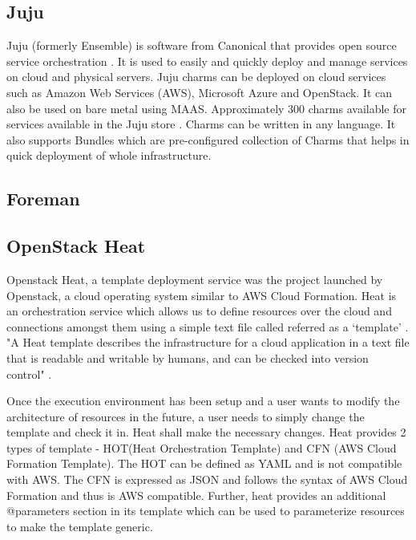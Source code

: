 {     \pv

\subsection{Juju}

     Juju (formerly Ensemble) is software from
     Canonical that provides open source service orchestration \cite{juju-paper}.
     It is
     used to easily and quickly deploy and manage services on cloud
     and physical servers. Juju charms can be deployed on cloud
     services such as Amazon Web Services (AWS), Microsoft Azure and
     OpenStack. It can also be used on bare metal using MAAS.
     Approximately 300 charms available
     for services available in the Juju store \cite{www-juju}. Charms can be written
     in any language. It also supports Bundles which are
     pre-configured collection of Charms that helps in quick
     deployment of whole infrastructure.

     \pv

\subsection{Foreman}

\pv 

\subsection{OpenStack Heat}

     Openstack Heat, a template deployment service was the project
     launched by Openstack, a cloud operating system similar to AWS
     Cloud Formation. Heat
     is an orchestration service which allows us to define resources
     over the cloud and connections amongst them using a simple text
     file called referred as a ‘template’ \cite{www-heat-blog-introduction}.
     "A Heat template describes
     the infrastructure for a cloud application in a text file that is
     readable and writable by humans, and can be checked into version
     control" \cite{www-heat-wiki}.

     Once the execution environment has been setup and a user wants to
     modify the architecture of resources in the future, a user needs
     to simply change the template and check it in. Heat shall make
     the necessary changes. Heat provides 2 types of template -
     HOT(Heat Orchestration Template) and CFN (AWS Cloud Formation
     Template). The HOT can be defined as YAML and is not compatible
     with AWS. The CFN is expressed as JSON and follows the syntax of
     AWS Cloud Formation and thus is AWS compatible. Further, heat
     provides an additional @parameters section in its template which
     can be used to parameterize resources to make the template
     generic.

}
